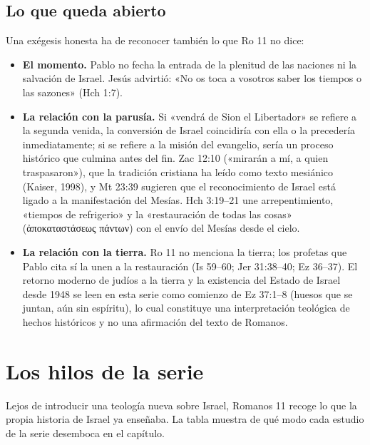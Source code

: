 \documentclass[11pt,letterpaper]{article}
\newcommand{\grc}[1]{\foreignlanguage{ancientgreek}{#1}}
\begin{document}
\subsection{Lo que queda abierto}
Una exégesis honesta ha de reconocer también lo que Ro 11 no dice:
\begin{itemize}
\item \textbf{El momento.} Pablo no fecha la entrada de la plenitud de las naciones ni la salvación de Israel. Jesús advirtió: «No os toca a vosotros saber los tiempos o las sazones» (Hch 1:7).
\item \textbf{La relación con la parusía.} Si «vendrá de Sion el Libertador» se refiere a la segunda venida, la conversión de Israel coincidiría con ella o la precedería inmediatamente; si se refiere a la misión del evangelio, sería un proceso histórico que culmina antes del fin. Zac 12:10 («mirarán a mí, a quien traspasaron»), que la tradición cristiana ha leído como texto mesiánico (Kaiser, 1998), y Mt 23:39 sugieren que el reconocimiento de Israel está ligado a la manifestación del Mesías. Hch 3:19--21 une arrepentimiento, «tiempos de refrigerio» y la «restauración de todas las cosas» (\grc{ἀποκαταστάσεως πάντων}) con el envío del Mesías desde el cielo.
\item \textbf{La relación con la tierra.} Ro 11 no menciona la tierra; los profetas que Pablo cita sí la unen a la restauración (Is 59--60; Jer 31:38--40; Ez 36--37). El retorno moderno de judíos a la tierra y la existencia del Estado de Israel desde 1948 se leen en esta serie como comienzo de Ez 37:1--8 (huesos que se juntan, aún sin espíritu), lo cual constituye una interpretación teológica de hechos históricos y no una afirmación del texto de Romanos.
\end{itemize}

\section{Los hilos de la serie}

Lejos de introducir una teología nueva sobre Israel, Romanos 11 recoge lo que la propia historia de Israel ya enseñaba. La tabla muestra de qué modo cada estudio de la serie desemboca en el capítulo.
\end{document}
